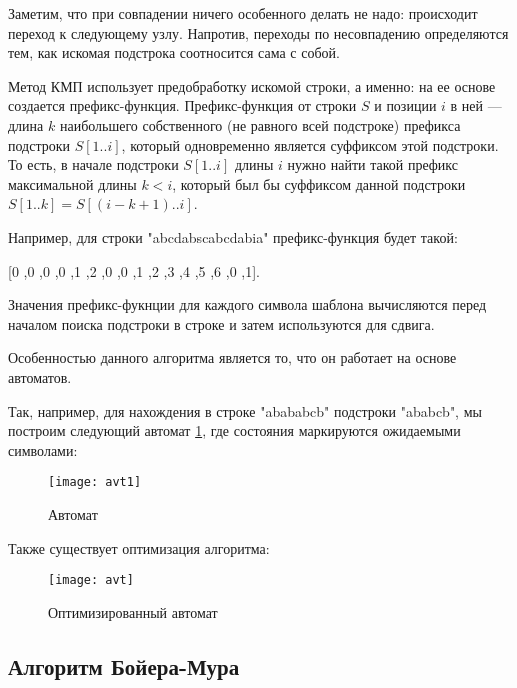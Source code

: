 \documentclass[a4paper, 14pt]{article}
\begin{document}
Заметим,  что  при  совпадении  ничего  особенного  делать  не  надо:  происходит  переход  к  следующему  узлу. Напротив,  переходы  по  несовпадению  определяются  тем,  как  искомая подстрока соотносится  сама  с  собой.

Метод КМП использует предобработку искомой строки, а именно: на ее основе создается префикс-функция.
Префикс-функция от строки $S$ и позиции $i$ в ней — длина $k$  наибольшего собственного (не равного всей подстроке) префикса подстроки $S[1.. i]$, который одновременно является суффиксом этой подстроки.
То есть, в начале подстроки $S[1.. i]$ длины $i$ нужно найти такой префикс максимальной длины $k < i$, который был бы суффиксом данной подстроки $S[1..k]=S[(i-k+1)..i]$.

Например, для строки "abcdabscabcdabia" префикс-функция будет такой:

[0 ,0 ,0 ,0 ,1 ,2 ,0 ,0 ,1 ,2 ,3 ,4 ,5 ,6 ,0 ,1].

Значения префикс-фукнции для каждого символа шаблона вычисляются перед началом поиска подстроки в строке и затем используются для сдвига.
	
	Особенностью данного алгоритма является то, что он работает на основе автоматов. 
	
	Так, например, для нахождения в строке "abababcb" подстроки "ababcb", мы построим следующий автомат \ref{fig:avt1}, где состояния маркируются ожидаемыми символами: 
	
	 \begin{figure}[H]
        	\begin{center}
        		\texttt{[image: avt1]}
        		\caption{Автомат}
        		\label{fig:avt1}
        	\end{center}
        \end{figure}
	
	\newpage
	Также существует оптимизация алгоритма:
	
	 \begin{figure}[H]
        	\begin{center}
        		\texttt{[image: avt]}
        		\caption{Оптимизированный автомат}
        		\label{fig:avt}
        	\end{center}
        \end{figure}

\subsection {Алгоритм Бойера-Мура} 
\end{document}
